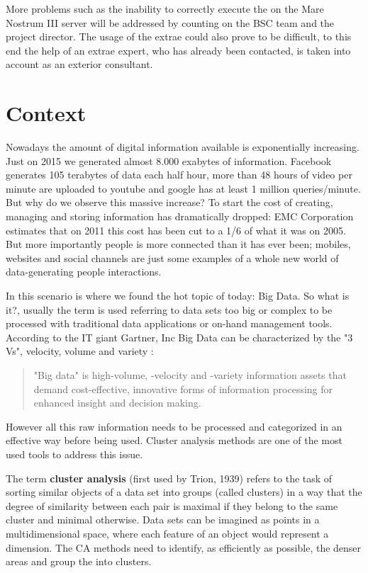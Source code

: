 More problems such as the inability to correctly execute the on the Mare Nostrum III server will be addressed by counting on the BSC team and the project director. The usage of the extrae could also prove to be difficult, to this end the help of an extrae expert, who has already been contacted, is taken into account as an exterior consultant. 

\section{Context}


Nowadays the amount of digital information available is exponentially increasing. Just on 2015 we generated almost 8.000 exabytes of information. Facebook generates 105 terabytes of data each half hour, more than 48 hours of video per minute are uploaded to youtube and google has at least 1 million queries/minute. But why do we observe this massive increase? To start the cost of creating, managing and storing information has dramatically dropped: EMC Corporation estimates that on 2011 this cost has been cut to a 1/6 of what it was on 2005. But more importantly people is more connected than it has ever been; mobiles, websites and social channels are just some examples of a whole new world of data-generating people interactions. 

In this scenario is where we found the hot topic of today: Big Data. So what is it?, usually the term is used referring to data sets too big or complex to be processed with traditional data applications or on-hand management tools. According to the IT giant Gartner, Inc Big Data can be characterized by the "3 Vs", velocity, volume and variety \cite{Laney}:

\begin{quotation}
"Big data" is high-volume, -velocity and -variety information assets that demand cost-effective, innovative forms of information processing for enhanced insight and decision making.
\end{quotation}


However all this raw information needs to be processed and categorized in an effective way before being used. Cluster analysis methods are one of the most used tools to address this issue. 

The term \textbf{cluster analysis} (first used by Trion, 1939) refers to the task of sorting similar objects of a data set into groups (called clusters) in a way that the degree of similarity between each pair is maximal if they belong to the same cluster and minimal otherwise. Data sets can be imagined as points in a multidimensional space, where each feature of an object would represent a dimension. The CA methods need to identify, as efficiently as possible, the denser areas and group the into clusters.

